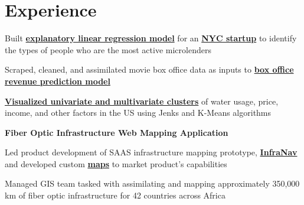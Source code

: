 \documentclass[letterpaper]{deedy-resume} %
\begin{document}
\hfill
%
%
\begin{minipage}[t]{0.66\textwidth} %


\section{Experience}


\vspace{\topsep} %
\begin{tightitemize}
\item Built \href{http://pgr-me.github.io/Microlending/}{\bf explanatory linear regression model} for an \href{http://playseeds.com/}{\bf NYC startup} to identify the types of people who are the most active microlenders
\item Scraped, cleaned, and assimilated movie box office data as inputs to \href{http://pgr-me.github.io/B-Horror/}{\bf box office revenue prediction model}
\item \href{http://pgr-me.github.io/Water/}{\bf Visualized univariate and multivariate clusters} of water usage, price, income, and other factors in the US using Jenks and K-Means algorithms
\end{tightitemize}

\sectionspace %


\begin{tightitemize}
\item {\bf Fiber Optic Infrastructure Web Mapping Application}
\begin{tightitemize}
\vspace{\topsep} %
\item Led product development of SAAS infrastructure mapping prototype, \href{http://infranav.com}{\bf InfraNav} and developed custom \href{http://hipconsult.com/en/insights/analytical-tools/energy-map}{\bf maps} to market product's capabilities
\item Managed GIS team tasked with assimilating and mapping approximately 350,000 km of fiber optic infrastructure for 42 countries across Africa
\end{tightitemize}
\end{tightitemize}


\end{minipage}
\end{document}
